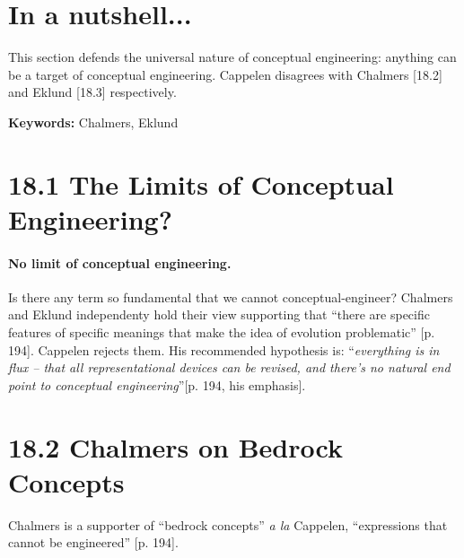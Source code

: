 \documentclass[
10pt, %
a4paper, %
twocolumn, %
landscape %
]{article}
\begin{document}
\pagestyle{myheadings} %
\markright{\doctitle} %


\thispagestyle{plain} %

\printtitle %


\section*{In a nutshell... }
This section defends the universal nature of conceptual engineering: anything can be
a target of conceptual engineering.
Cappelen disagrees with Chalmers [18.2] and Eklund [18.3] respectively.

\noindent \textbf{Keywords:} Chalmers, Eklund

\section*{18.1 The Limits of Conceptual Engineering?}
\paragraph{No limit of conceptual engineering. }
Is there any term so fundamental that we cannot conceptual-engineer?
Chalmers and Eklund independenty hold their view supporting that
``there are specific features of specific meanings that make
the idea of evolution problematic'' [p. 194].
Cappelen rejects them.
His recommended hypothesis is: ``\emph{everything is in flux -- that all representational devices
can be revised, and there's no natural end point to conceptual engineering}''[p. 194, his emphasis].

\section*{18.2 Chalmers on Bedrock Concepts}
Chalmers is a supporter of ``bedrock concepts'' \textit{a la} Cappelen, ``expressions that cannot be engineered'' [p. 194].
\end{document}
